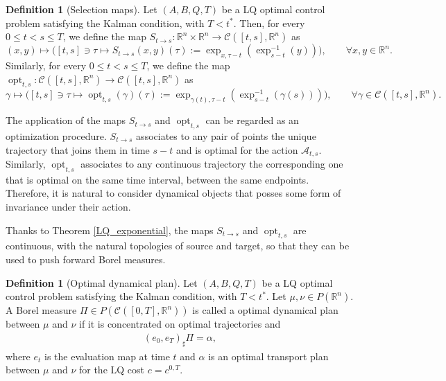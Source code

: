 \documentclass[reqno]{amsart}
\DeclareMathOperator{\opt}{opt}
\theoremstyle{plain}
\theoremstyle{definition}
\newtheorem{Def}[thm]{Definition}
\theoremstyle{remark}
\newcommand{\R}{\mathbb{R}}
\begin{document}
        \begin{Def}[Selection maps]\label{def_selection_maps}
        Let $(A,B,Q,T)$ be a LQ optimal control problem satisfying the Kalman condition, with $T<t^*$. 
        Then, for every $0\leq t<s\leq T$, we define the map $S_{t\to s}:\mathbb{R}^n\times\mathbb{R}^n\to\mathcal{C}([t,s],\mathbb{R}^n)$ as
        \begin{equation}
            (x,y)\mapsto \bigg([t,s]\ni\tau\mapsto S_{t\to s}(x,y)(\tau):=\exp_{x,\tau-t}(\exp_{s-t}^{-1}(y))\bigg),\qquad\forall x,y \in \R^n.
        \end{equation}
        Similarly, for every $0\leq t<s\leq T$, we define the map 
        $\opt_{t,s}:\mathcal{C}([t,s],\mathbb{R}^n)\to\mathcal{C}([t,s],\mathbb{R}^n)$ as
        \begin{equation}
            \gamma\mapsto \bigg([t,s]\ni\tau\mapsto \opt_{t,s}(\gamma)(\tau):=\exp_{\gamma(t),\tau-t}(\exp_{s-t}^{-1}(\gamma(s)))\bigg),\qquad\forall\gamma\in\mathcal{C}([t,s],\mathbb{R}^n).
        \end{equation}
        \end{Def}
        The application of the maps $S_{t\to s}$ and $\opt_{t,s}$ can be regarded as an optimization procedure. $S_{t\to s}$ associates to any pair of points the unique trajectory that joins them in time $s-t$ and is optimal for the action $\mathcal{A}_{t,s}$. Similarly, $\opt_{t,s}$ associates to any continuous trajectory the corresponding one that is optimal on the same time interval, between the same endpoints. Therefore, it is natural to consider dynamical objects that posses some form of invariance under their action.
        
        Thanks to Theorem \ref{LQ_exponential}, the maps $S_{t\to s}$ and $\opt_{t,s}$ are continuous, with the natural topologies of source and target, so that they can be used to push forward Borel measures.
	\begin{Def}[Optimal dynamical plan]
		Let $(A,B,Q,T)$ be a LQ optimal control problem satisfying the Kalman condition, with $T<t^*$. Let $\mu,\nu\in P(\mathbb{R}^n)$. A Borel measure $\Pi\in P(\mathcal{C}([0,T],\mathbb{R}^n))$ is called a optimal dynamical plan between $\mu$ and $\nu$ if it is concentrated on optimal trajectories and
		\begin{align}
			(e_0,e_T)_{\sharp}\Pi=\alpha,
		\end{align}
		where $e_t$ is the evaluation map at time $t$ and $\alpha$ is an optimal transport plan between $\mu$ and $\nu$ for the LQ cost $c=c^{0,T}$.
	\end{Def}
\end{document}
